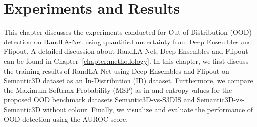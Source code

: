

    \chapter{Experiments and Results}
    This chapter discusses the experiments conducted for Out-of-Distribution (OOD) detection on RandLA-Net using quantified uncertainty from Deep Ensembles and Flipout.
    A detailed discussion about RandLA-Net, Deep Ensembles and Flipout can be found in Chapter~\ref{chapter:methodology}. In this chapter, we first discuss the training results of RandLA-Net using Deep Ensembles and Flipout on Semantic3D dataset as an In-Distribution (ID) dataset.
    Furthermore, we compare the Maximum Softmax Probability (MSP) as in \cite{hendrycks2016baseline_MSP} and entropy values for the proposed OOD benchmark datasets Semantic3D-vs-S3DIS and Semantic3D-vs-Semantic3D without colour.
    Finally, we visualize and evaluate the performance of OOD detection using the AUROC score.

